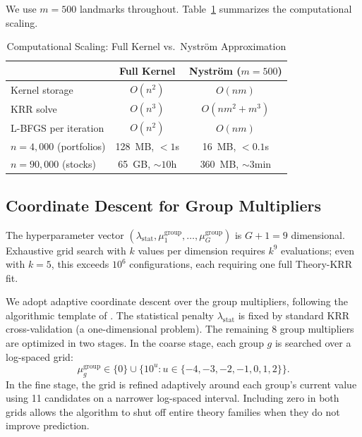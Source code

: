 We use $m = 500$ landmarks throughout.
Table~\ref{tab:nystrom_scaling} summarizes the computational scaling.

\begin{table}[h]
\centering
\caption{Computational Scaling: Full Kernel vs.\ Nystr\"{o}m Approximation}
\label{tab:nystrom_scaling}
\small
\begin{tabular}{lcc}
\toprule
 & Full Kernel & Nystr\"{o}m ($m = 500$) \\
\midrule
Kernel storage                & $O(n^2)$  & $O(nm)$ \\
KRR solve                     & $O(n^3)$  & $O(nm^2 + m^3)$ \\
L-BFGS per iteration          & $O(n^2)$  & $O(nm)$ \\
\midrule
$n = 4{,}000$ (portfolios)    & 128~MB, $<1$s & 16~MB, $<0.1$s \\
$n = 90{,}000$ (stocks)       & 65~GB, $\sim 10$h & 360~MB, $\sim 3$min \\
\bottomrule
\end{tabular}
\end{table}

\subsection{Coordinate Descent for Group Multipliers}
\label{app:coord_descent}

The hyperparameter vector $(\lambda_{\mathrm{stat}}, \mu_1^{\mathrm{group}}, \ldots, \mu_G^{\mathrm{group}})$ is $G + 1 = 9$ dimensional.
Exhaustive grid search with $k$ values per dimension requires $k^9$ evaluations; even with $k = 5$, this exceeds $10^6$ configurations, each requiring one full Theory-KRR fit.

We adopt adaptive coordinate descent over the group multipliers, following the algorithmic template of \citet{friedman2010regularization}.
The statistical penalty $\lambda_{\mathrm{stat}}$ is fixed by standard KRR cross-validation (a one-dimensional problem).
The remaining 8 group multipliers are optimized in two stages.
In the coarse stage, each group $g$ is searched over a log-spaced grid:
\begin{equation}
\label{eq:cd_candidates}
\mu_g^{\mathrm{group}} \in \{0\} \cup \{10^{u} : u \in \{-4, -3, -2, -1, 0, 1, 2\}\}.
\end{equation}
In the fine stage, the grid is refined adaptively around each group's current value using 11 candidates on a narrower log-spaced interval.
Including zero in both grids allows the algorithm to shut off entire theory families when they do not improve prediction.


